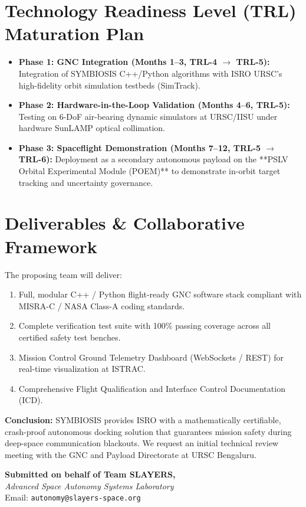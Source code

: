 \documentclass[11pt,a4paper]{article}
\begin{document}
\section{Technology Readiness Level (TRL) Maturation Plan}

\begin{itemize}[itemsep=2pt]
    \item \textbf{Phase 1: GNC Integration (Months 1--3, TRL-4 $\rightarrow$ TRL-5):}
    Integration of SYMBIOSIS C++/Python algorithms with ISRO URSC's high-fidelity orbit simulation testbeds (SimTrack).
    \item \textbf{Phase 2: Hardware-in-the-Loop Validation (Months 4--6, TRL-5):}
    Testing on 6-DoF air-bearing dynamic simulators at URSC/IISU under hardware SunLAMP optical collimation.
    \item \textbf{Phase 3: Spaceflight Demonstration (Months 7--12, TRL-5 $\rightarrow$ TRL-6):}
    Deployment as a secondary autonomous payload on the **PSLV Orbital Experimental Module (POEM)** to demonstrate in-orbit target tracking and uncertainty governance.
\end{itemize}

\section{Deliverables \& Collaborative Framework}

The proposing team will deliver:
\begin{enumerate}[itemsep=1pt]
    \item Full, modular C++ / Python flight-ready GNC software stack compliant with MISRA-C / NASA Class-A coding standards.
    \item Complete verification test suite with 100\% passing coverage across all certified safety test benches.
    \item Mission Control Ground Telemetry Dashboard (WebSockets / REST) for real-time visualization at ISTRAC.
    \item Comprehensive Flight Qualification and Interface Control Documentation (ICD).
\end{enumerate}

\noindent
\textbf{Conclusion:} SYMBIOSIS provides ISRO with a mathematically certifiable, crash-proof autonomous docking solution that guarantees mission safety during deep-space communication blackouts. We request an initial technical review meeting with the GNC and Payload Directorate at URSC Bengaluru.

\vspace{4mm}
\noindent
\textbf{Submitted on behalf of Team SLAYERS,}\\
\textit{Advanced Space Autonomy Systems Laboratory}\\
Email: \texttt{autonomy@slayers-space.org}
\end{document}
